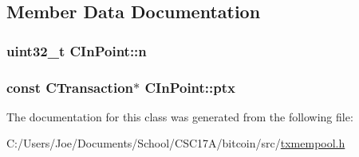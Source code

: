 \subsection{Member Data Documentation}
\hypertarget{class_c_in_point_a456e18a182bfa70cbf63d28561c3ae1c}{}
\subsubsection[{n}]{\setlength{\rightskip}{0pt plus 5cm}uint32\+\_\+t C\+In\+Point\+::n}\label{class_c_in_point_a456e18a182bfa70cbf63d28561c3ae1c}
\hypertarget{class_c_in_point_a76bf1c9b14d4ba95ff3e260cd47a9ce4}{}
\subsubsection[{ptx}]{\setlength{\rightskip}{0pt plus 5cm}const C\+Transaction$\ast$ C\+In\+Point\+::ptx}\label{class_c_in_point_a76bf1c9b14d4ba95ff3e260cd47a9ce4}


The documentation for this class was generated from the following file\+:\begin{DoxyCompactItemize}
\item 
C\+:/\+Users/\+Joe/\+Documents/\+School/\+C\+S\+C17\+A/bitcoin/src/\hyperlink{txmempool_8h}{txmempool.\+h}\end{DoxyCompactItemize}
